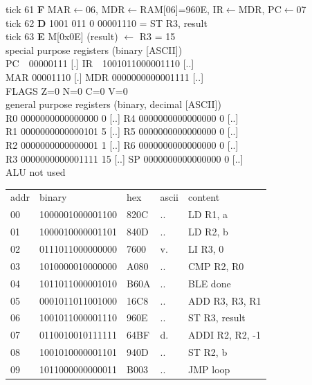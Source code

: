 \noindent\begin{tcolorbox}[stepbox, title={Instruction 21 \hfill ticks 61 to 63 \quad ST R3, result}]
\textcolor{dim}{tick 61} \textbf{F} MAR$\leftarrow$06, MDR$\leftarrow$RAM[06]=960E, IR$\leftarrow$MDR, PC$\leftarrow$07\\
\textcolor{dim}{tick 62} \textbf{D} 1001 011 0 00001110 = ST R3, result\\
\textcolor{dim}{tick 63} \textbf{E} M[0x0E] (result) $\leftarrow$ R3 = 15\\[2pt]
\textcolor{dim}{special purpose registers (binary [ASCII])}\\
PC~~00000111 [.] \hfill IR~~1001011000001110 [..]\\
MAR 00001110 [.] \hfill MDR 0000000000001111 [..]\\
FLAGS Z=0 N=0 C=0 V=0\\[2pt]
\textcolor{dim}{general purpose registers (binary, decimal [ASCII])}\\
R0 0000000000000000 0 [..] \hfill R4 0000000000000000 0 [..]\\
R1 0000000000000101 5 [..] \hfill R5 0000000000000000 0 [..]\\
R2 0000000000000001 1 [..] \hfill R6 0000000000000000 0 [..]\\
R3 0000000000001111 15 [..] \hfill SP 0000000000000000 0 [..]\\
\textcolor{dim}{ALU not used}\\[2pt]
{\setlength{\tabcolsep}{2pt}\begin{tabular}{@{}lllll@{}}
\textcolor{dim}{addr} & \textcolor{dim}{binary} & \textcolor{dim}{hex} & \textcolor{dim}{ascii} & \textcolor{dim}{content}\\
00 & 1000001000001100 & 820C & .. & LD R1, a\\
01 & 1000010000001101 & 840D & .. & LD R2, b\\
02 & 0111011000000000 & 7600 & v. & LI R3, 0\\
03 & 1010000010000000 & A080 & .. & CMP R2, R0\\
04 & 1011011000001010 & B60A & .. & BLE done\\
05 & 0001011011001000 & 16C8 & .. & ADD R3, R3, R1\\
06 & 1001011000001110 & 960E & .. & ST R3, result\\
\rowcolor{pcc}07 & 0110010010111111 & 64BF & d. & ADDI R2, R2, -1\\
08 & 1001010000001101 & 940D & .. & ST R2, b\\
09 & 1011000000000011 & B003 & .. & JMP loop\\

\end{tabular}}
\end{tcolorbox}
